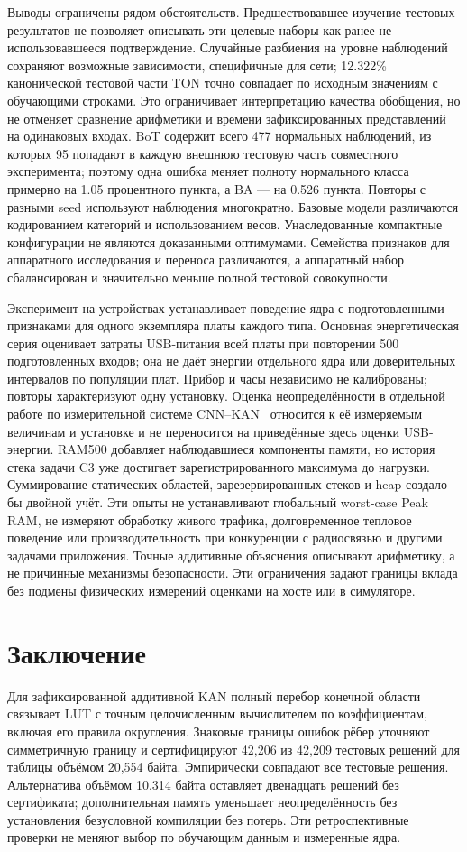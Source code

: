 Выводы ограничены рядом обстоятельств. Предшествовавшее изучение тестовых результатов не позволяет описывать эти целевые наборы как ранее не использовавшееся подтверждение. Случайные разбиения на уровне наблюдений сохраняют возможные зависимости, специфичные для сети; 12.322\% канонической тестовой части TON точно совпадает по исходным значениям с обучающими строками. Это ограничивает интерпретацию качества обобщения, но не отменяет сравнение арифметики и времени зафиксированных представлений на одинаковых входах. BoT содержит всего 477 нормальных наблюдений, из которых 95 попадают в каждую внешнюю тестовую часть совместного эксперимента; поэтому одна ошибка меняет полноту нормального класса примерно на 1.05 процентного пункта, а BA --- на 0.526 пункта. Повторы с разными seed используют наблюдения многократно. Базовые модели различаются кодированием категорий и использованием весов. Унаследованные компактные конфигурации не являются доказанными оптимумами. Семейства признаков для аппаратного исследования и переноса различаются, а аппаратный набор сбалансирован и значительно меньше полной тестовой совокупности.

Эксперимент на устройствах устанавливает поведение ядра с подготовленными признаками для одного экземпляра платы каждого типа. Основная энергетическая серия оценивает затраты USB-питания всей платы при повторении 500 подготовленных входов; она не даёт энергии отдельного ядра или доверительных интервалов по популяции плат. Прибор и часы независимо не калиброваны; повторы характеризуют одну установку. Оценка неопределённости в отдельной работе по измерительной системе CNN--KAN~\cite{faggi2026sensor} относится к её измеряемым величинам и установке и не переносится на приведённые здесь оценки USB-энергии. RAM500 добавляет наблюдавшиеся компоненты памяти, но история стека задачи C3 уже достигает зарегистрированного максимума до нагрузки. Суммирование статических областей, зарезервированных стеков и heap создало бы двойной учёт. Эти опыты не устанавливают глобальный worst-case Peak RAM, не измеряют обработку живого трафика, долговременное тепловое поведение или производительность при конкуренции с радиосвязью и другими задачами приложения. Точные аддитивные объяснения описывают арифметику, а не причинные механизмы безопасности. Эти ограничения задают границы вклада без подмены физических измерений оценками на хосте или в симуляторе.

\section{Заключение}
Для зафиксированной аддитивной KAN полный перебор конечной области связывает LUT с точным целочисленным вычислителем по коэффициентам, включая его правила округления. Знаковые границы ошибок рёбер уточняют симметричную границу и сертифицируют 42,206 из 42,209 тестовых решений для таблицы объёмом 20,554 байта. Эмпирически совпадают все тестовые решения. Альтернатива объёмом 10,314 байта оставляет двенадцать решений без сертификата; дополнительная память уменьшает неопределённость без установления безусловной компиляции без потерь. Эти ретроспективные проверки не меняют выбор по обучающим данным и измеренные ядра.

